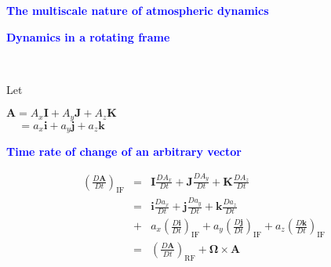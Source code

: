 \documentclass[a4]{seminar}
\newcommand{\B}[1]{\textcolor{blue}{#1}}
\begin{document}

\begin{slide}

\B{\bf The multiscale nature of atmospheric dynamics}

\vspace{2mm}

\begin{center}
\end{center}


\end{slide}


\begin{slide}

\B{\bf Dynamics in a rotating frame}

\vspace{6mm}

\begin{minipage}[t]{50mm}
\end{minipage}
\ \ \ \ \ \ \ 
\begin{minipage}[b]{50mm}
Let
\vspace{3mm}

\( \mathbf{A} = A_x \mathbf{I} + A_y \mathbf{J} + A_z \mathbf{K} \) \\

\(  \ \ \ \ \ = a_x \mathbf{i} + a_y \mathbf{j} + a_z \mathbf{k} \) 
\end{minipage}

\end{slide}


\begin{slide}

\B{\bf Time rate of change of an arbitrary vector}

\vspace{6mm}


\begin{eqnarray}
\left( \frac{D \mathbf{A}}{Dt} \right)_{\mathrm{IF}}
&
=
&
\mathbf{I} \frac{D A_x}{Dt} +
\mathbf{J} \frac{D A_y}{Dt} +
\mathbf{K} \frac{D A_z}{Dt}
\nonumber \\
&
=
&
\mathbf{i} \frac{D a_x}{Dt} +
\mathbf{j} \frac{D a_y}{Dt} +
\mathbf{k} \frac{D a_z}{Dt}
\nonumber \\
&
+
&
a_x \left( \frac{D \mathbf{i}}{Dt} \right)_{\mathrm{IF}} +
a_y \left( \frac{D \mathbf{j}}{Dt} \right)_{\mathrm{IF}} +
a_z \left( \frac{D \mathbf{k}}{Dt} \right)_{\mathrm{IF}}
\nonumber \\
&
=
&
\left( \frac{D \mathbf{A}}{Dt} \right)_{\mathrm{RF}}
+
\boldsymbol{\Omega} \times \mathbf{A}
\nonumber
\end{eqnarray}

\vspace{3mm}




\end{slide}
\end{document}
